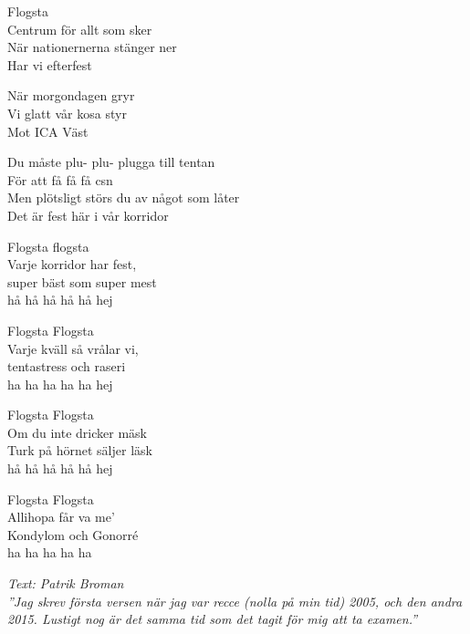 {Flogsta\\
Centrum för allt som sker\\
När nationernerna stänger ner\\
Har vi efterfest\par
\vspace{6pt}
När morgondagen gryr\\
Vi glatt vår kosa styr\\
Mot ICA Väst\par
\vspace{6pt}
Du måste plu- plu- plugga till tentan\\
För att få få få csn\\
Men plötsligt störs du av något som låter\\
Det är fest här i vår korridor\par
\vspace{6pt}
Flogsta flogsta\\
Varje korridor har fest,\\
super bäst som super mest\\
hå hå hå hå hå hej\par
\vspace{6pt}
Flogsta Flogsta\\
Varje kväll så vrålar vi,\\
tentastress och raseri\\
ha ha ha ha ha hej\par
\vspace{6pt}
Flogsta Flogsta\\
Om du inte dricker mäsk\\
Turk på hörnet säljer läsk\\
hå hå hå hå hå hej\par
\vspace{6pt}
Flogsta Flogsta\\
Allihopa får va me'\\
Kondylom och Gonorré\\
ha ha ha ha ha}\par
\vspace{8pt}
{\footnotesize\textit{Text: Patrik Broman\\''Jag skrev första versen
när jag var recce (nolla på min tid) 2005, och den andra 2015. Lustigt
nog är det samma tid som det tagit för mig att ta examen.''}}
